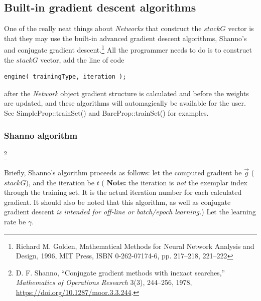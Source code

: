 \documentclass{report}
\begin{document}
\subsection{Built-in gradient descent algorithms}

One of the really neat things about {\em Networks} that construct the
$stackG$ vector is that they may use the built-in advanced gradient
descent algorithms, Shanno's and conjugate
gradient descent.\footnote{Richard
M. Golden, Mathematical Methods for Neural Network Analysis and
Design, 1996, MIT Press, ISBN 0-262-07174-6, pp. 217--218, 221--222}
All the programmer needs to do is to construct the $stackG$ vector,
add the line of code
\begin{verbatim}
engine( trainingType, iteration );
\end{verbatim}
after the {\em Network} object gradient structure is calculated and
before the weights are updated, and these algorithms will
automagically be available for the user.  See SimpleProp::trainSet()
and BareProp::trainSet() for examples.

\subsubsection{Shanno algorithm}
\footnote{D. F. Shanno, ``Conjugate gradient methods with inexact searches,''
\emph{Mathematics of Operations Research} 3(3), 244--256, 1978,
\url{https://doi.org/10.1287/moor.3.3.244}.}

Briefly, Shanno's algorithm proceeds as follows: let the computed
gradient be $\vec{g}$ ($stackG$), and the iteration be $t$ ({\bf
Note:} the iteration is {\em not} the exemplar index through the
training set. It is the actual iteration number for each calculated
gradient.  It should also be noted that this algorithm, as well as
conjugate gradient descent {\em is intended for off-line or
batch/epoch learning.}) Let the learning rate be $\gamma$.
\end{document}
